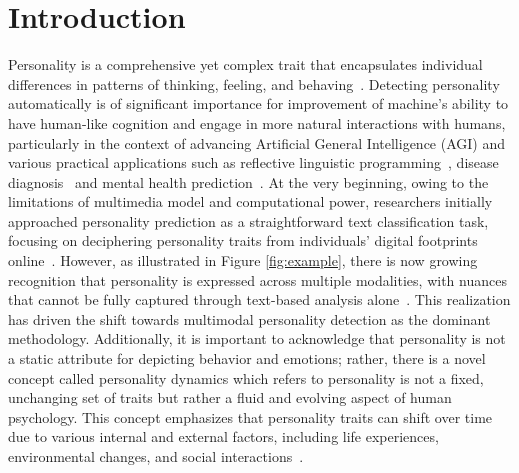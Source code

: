 \section{Introduction}

Personality is a comprehensive yet complex trait that encapsulates individual differences in patterns of thinking, feeling, and behaving~\cite{article}. Detecting personality automatically is of significant importance for improvement of machine's ability to have human-like cognition and engage in more natural interactions with humans, particularly in the context of advancing Artificial General Intelligence (AGI) and various practical applications such as reflective linguistic programming~\cite{fischer2023reflective}, disease diagnosis~\cite{6709853} and mental health prediction~\cite{feng2024far}. 
At the very beginning, owing to the limitations of multimedia model and computational power, researchers initially approached personality prediction as a straightforward text classification task, focusing on deciphering personality traits from individuals' digital footprints online~\cite{kerz2022pushing,yang_multi-document_2021}. However, as illustrated in Figure \ref{fig:example}, there is now growing recognition that personality is expressed across multiple modalities, with nuances that cannot be fully captured through text-based analysis alone~\cite{10.1145/3542954.3543012,ijcai2022p633,10030882}. This realization has driven the shift towards multimodal personality detection as the dominant methodology. Additionally, it is important to acknowledge that personality is not a static attribute for depicting behavior and emotions; rather, there is a novel concept called personality dynamics which refers to personality is not a fixed, unchanging set of traits but rather a fluid and evolving aspect of human psychology. This concept emphasizes that personality traits can shift over time due to various internal and external factors, including life experiences, environmental changes, and social interactions~\cite{9407599,doi:10.1177/08902070211022491}.
